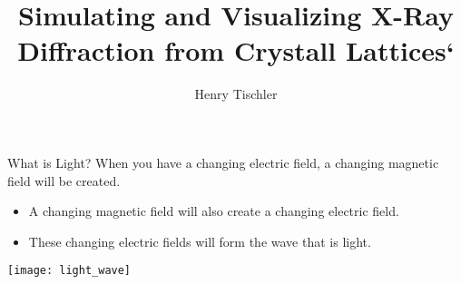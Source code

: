 \documentclass{beamer}
\title {Simulating and Visualizing X-Ray Diffraction from Crystall Lattices`}
\author{Henry Tischler}
\institute[Institute of Computing in Research]
\begin{document}
	\titlepage


\begin {frame}{What is Light?}
	When you have a changing electric field, a changing magnetic field will be created.

	\begin{itemize}
	\item A changing magnetic field will also create a changing electric field.
	\item These changing electric fields will form the wave that is light.
	\end{itemize}		
\end{frame}

\begin {frame}
	\texttt{[image: light\_wave]}
\end{frame}
\end{document}
